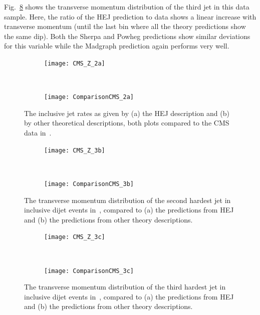 			Fig.~\ref{fig:CMS_3c} shows the transverse momentum distribution of the third
			jet in this data sample.  Here, the ratio of the HEJ prediction to data shows a
			linear increase with transverse momentum (until the last bin where all the
			theory predictions show the same dip).  Both the Sherpa and Powheg predictions
			show similar deviations for this variable while the Madgraph prediction again
			performs very well.


			\begin{figure}[h]
			  \centering
			  \begin{subfigure}[b]{0.46\textwidth}
			    \texttt{[image: CMS\_Z\_2a]}
			    \caption{}
			    \label{fig:HEJ_CMS_2a}
			  \end{subfigure}
			  ~
			  \begin{subfigure}[b]{0.48\textwidth}
			    \texttt{[image: ComparisonCMS\_2a]}
			    \caption{}
			    \label{fig:MC_CMS_2a}
			  \end{subfigure}
			  \caption{The inclusive jet rates as given by (a) the HEJ description and (b)
			    by other theoretical descriptions, both plots compared to the CMS data in~\cite{Khachatryan:2014zya}.}
			  \label{fig:CMS_2a}

			  \begin{subfigure}[b]{0.46\textwidth}
			    \texttt{[image: CMS\_Z\_3b]}
			    \caption{}
			    \label{fig:HEJ_CMS_7b}
			  \end{subfigure}
			  ~
			  \begin{subfigure}[b]{0.48\textwidth}
			    \texttt{[image: ComparisonCMS\_3b]}
			    \caption{}
			    \label{fig:MC_CMS_7b}
			  \end{subfigure}
			  \caption{The transverse momentum distribution of the second hardest jet in
			    inclusive dijet events in~\cite{Khachatryan:2014zya}, compared to (a) the
			    predictions from HEJ and (b) the predictions from other theory descriptions.}
			  \label{fig:CMS_3b}
			\end{figure}

			\begin{figure}[H]
			  \centering
			  \begin{subfigure}[b]{0.46\textwidth}
			    \texttt{[image: CMS\_Z\_3c]}
			    \caption{}
			    \label{fig:HEJ_CMS_7b}
			  \end{subfigure}
			  ~
			  \begin{subfigure}[b]{0.48\textwidth}
			    \texttt{[image: ComparisonCMS\_3c]}
			    \caption{}
			    \label{fig:MC_CMS_7b}
			  \end{subfigure}
			  \caption{The transverse momentum distribution of the third hardest jet in
			    inclusive dijet events in~\cite{Khachatryan:2014zya}, compared to (a) the
			    predictions from HEJ and (b) the predictions from other theory descriptions.}
			  \label{fig:CMS_3c}
			\end{figure}

